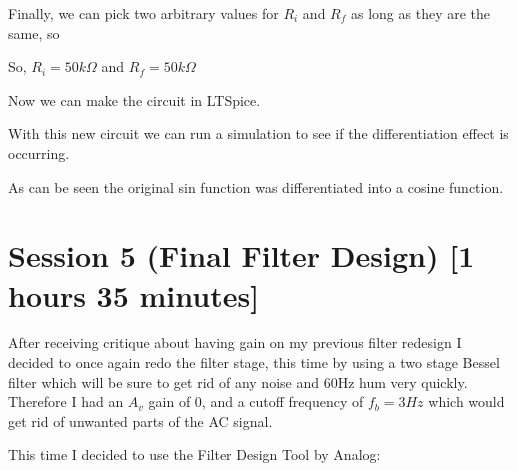 \documentclass{article}
\begin{document}
Finally, we can pick two arbitrary values for $R_i$ and $R_f$ as long as they are the same, so
\begin{center}
    So, $\boxed{R_i = 50k\Omega}$ and $\boxed{R_f = 50k\Omega}$
\end{center}
Now we can make the circuit in LTSpice.
\begin{center}
\end{center}
With this new circuit we can run a simulation to see if the differentiation effect is occurring.
\begin{center}
\end{center}
As can be seen the original sin function was differentiated into a cosine function.
\newpage
\section{Session 5 (Final Filter Design) [1 hours 35 minutes]}
After receiving critique about having gain on my previous filter redesign I decided to once again redo the filter stage, this time by using a two stage Bessel filter which will be sure to get rid of any noise and 60Hz hum very quickly. Therefore I had an $A_v$ gain of 0, and a cutoff frequency of $f_b = 3Hz$ which would get rid of unwanted parts of the AC signal.

This time I decided to use the Filter Design Tool by Analog:
\end{document}
